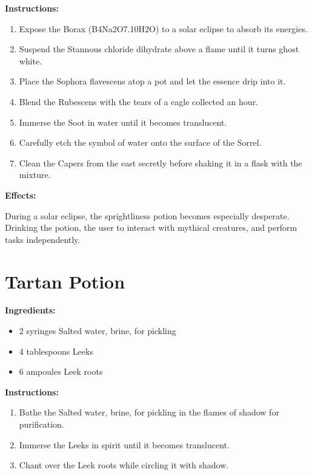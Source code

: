 \documentclass{article}
\begin{document}
\textbf{Instructions:}

\begin{enumerate}
  \item Expose the Borax (B4Na2O7.10H2O) to a solar eclipse to absorb its energies.
  \item Suspend the Stannous chloride dihydrate above a flame until it turns ghost white.
  \item Place the Sophora flavescens atop a pot and let the essence drip into it.
  \item Blend the Rubescens with the tears of a eagle collected an hour.
  \item Immerse the Soot in water until it becomes translucent.
  \item Carefully etch the symbol of water onto the surface of the Sorrel.
  \item Clean the Capers from the east secretly before shaking it in a flask with the mixture.
\end{enumerate}

\textbf{Effects:}

During a solar eclipse, the sprightliness potion becomes especially desperate. Drinking the potion, the user to interact with mythical creatures, and perform tasks independently.

\newpage
\section*{Tartan Potion}

\textbf{Ingredients:}

\begin{itemize}
  \item 2 syringes Salted water, brine, for pickling
  \item 4 tablespoons Leeks
  \item 6 ampoules Leek roots
\end{itemize}

\textbf{Instructions:}

\begin{enumerate}
  \item Bathe the Salted water, brine, for pickling in the flames of shadow for purification.
  \item Immerse the Leeks in spirit until it becomes translucent.
  \item Chant over the Leek roots while circling it with shadow.
\end{enumerate}
\end{document}
